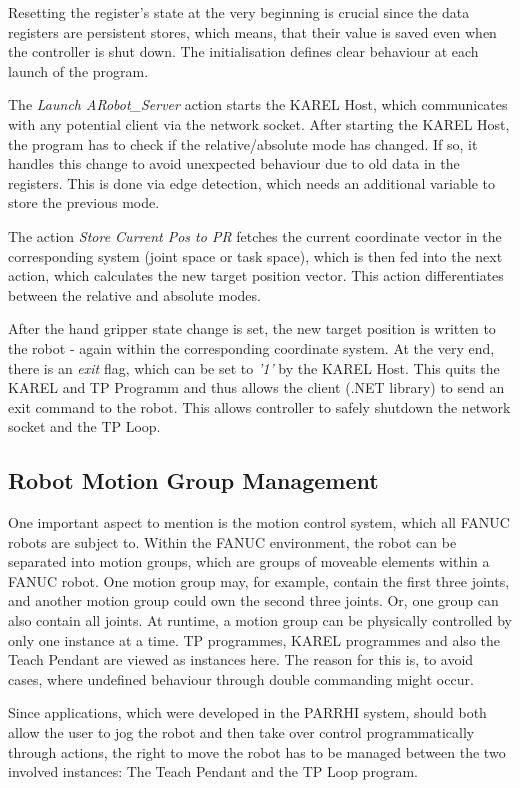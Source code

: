 Resetting the register's state at the very beginning is crucial since the data registers are persistent stores, which means, that their value is saved even when the controller is shut down. The initialisation defines clear behaviour at each launch of the program.

The \textit{Launch ARobot\_Server} action starts the KAREL Host, which communicates with any potential client via the network socket. After starting the KAREL Host, the program has to check if the relative/absolute mode has changed. If so, it handles this change to avoid unexpected behaviour due to old data in the registers. This is done via edge detection, which needs an additional variable to store the previous mode. 

The action \textit{Store Current Pos to PR} fetches the current coordinate vector in the corresponding system (joint space or task space), which is then fed into the next action, which calculates the new target position vector. This action differentiates between the relative and absolute modes. 

After the hand gripper state change is set, the new target position is written to the robot - again within the corresponding coordinate system. At the very end, there is an \textit{exit} flag, which can be set to \textit{'1'} by the KAREL Host. This quits the KAREL and TP Programm and thus allows the client (.NET library) to send an exit command to the robot. This allows controller to safely shutdown the network socket and the TP Loop. 

\subsection{Robot Motion Group Management}

One important aspect to mention is the motion control system, which all FANUC robots are subject to. Within the FANUC environment, the robot can be separated into motion groups, which are groups of moveable elements within a FANUC robot. One motion group may, for example, contain the first three joints, and another motion group could own the second three joints. Or, one group can also contain all joints. At runtime, a motion group can be physically controlled by only one instance at a time. TP programmes, KAREL programmes and also the Teach Pendant are viewed as instances here. The reason for this is, to avoid cases, where undefined behaviour through double commanding might occur. 

Since applications, which were developed in the PARRHI system, should both allow the user to jog the robot and then take over control programmatically through actions, the right to move the robot has to be managed between the two involved instances: The Teach Pendant and the TP Loop program.

